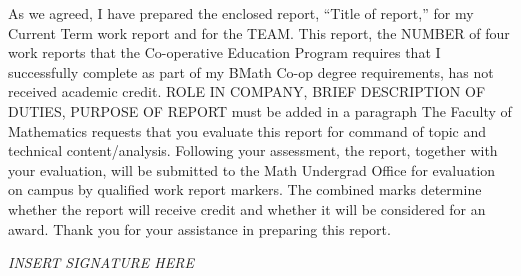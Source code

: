 \documentclass[12pt]{article}
\newcommand{\term}{Current Term } %
\newcommand{\WTT}{Title of report}
\begin{document}




 \FirstPage

\newpage




\LetterHead



As we agreed, I have prepared the enclosed report, “\WTT,” for
my \term work report and for the TEAM. This
report, the NUMBER of four work reports that the Co-operative Education Program
requires that I successfully complete as part of my BMath Co-op degree
requirements, has not received academic credit.
\vskip 10pt
ROLE IN COMPANY, BRIEF DESCRIPTION OF DUTIES, PURPOSE OF REPORT must be added in a paragraph
\vskip 10pt 
The Faculty of Mathematics requests that you evaluate this report for command
of topic and technical content/analysis. Following your assessment, the report,
together with your evaluation, will be submitted to the Math Undergrad Office
for evaluation on campus by qualified work report markers. The combined
marks determine whether the report will receive credit and whether it will be
considered for an award.
Thank you for your assistance in preparing this report.

\textit{INSERT SIGNATURE HERE}






\newpage
\pageFormatting 
\tableofcontents
\listoffigures






\end{document}
